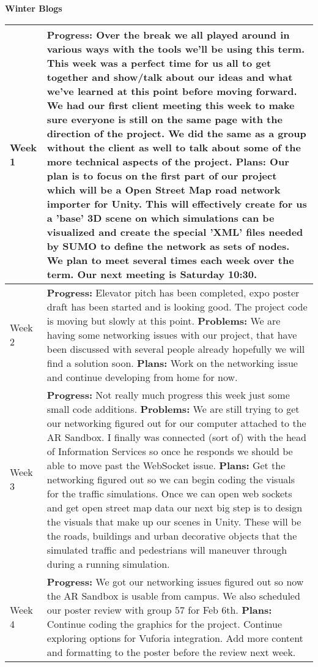 \documentclass[letterpaper, 10pt, onecolumn, draftclsnofoot]{IEEEtran}
\begin{document}
        \begin{center}
        \large{\textbf{Winter Blogs}} \\
        \begin{longtable}{|p{4cm}|p{10cm}|}
            \hline
            Week 1 & \textbf{Progress:} Over the break we all played around in various ways with the tools we'll be using this term. This week was a perfect time for us all to get together and show/talk about our ideas and what we've learned at this point before moving forward. We had our first client meeting this week to make sure everyone is still on the same page with the direction of the project. We did the same as a group without the client as well to talk about some of the more technical aspects of the project. \textbf{Plans:} Our plan is to focus on the first part of our project which will be a Open Street Map road network importer for Unity. This will effectively create for us a 'base' 3D scene on which simulations can be visualized and create the special 'XML' files needed by SUMO to define the network as sets of nodes. We plan to meet several times each week over the term. Our next meeting is Saturday 10:30.\\
            \hline
            Week 2 & \textbf{Progress:} Elevator pitch has been completed, expo poster draft has been started and is looking good. The project code is moving but slowly at this point. \textbf{Problems:} We are having some networking issues with our project, that have been discussed with several people already hopefully we will find a solution soon. \textbf{Plans:} Work on the networking issue and continue developing from home for now. \\
            \hline
            Week 3 & \textbf{Progress:} Not really much progress this week just some small code additions. \textbf{Problems:} We are still trying to get our networking figured out for our computer attached to the AR Sandbox. I finally was connected (sort of) with the head of Information Services so once he responds we should be able to move past the WebSocket issue. \textbf{Plans:} Get the networking figured out so we can begin coding the visuals for the traffic simulations. Once we can open web sockets and get open street map data our next big step is to design the visuals that make up our scenes in Unity. These will be the roads, buildings and urban decorative objects that the simulated traffic and pedestrians will maneuver through during a running simulation. \\
            \hline
            Week 4 & \textbf{Progress:} We got our networking issues figured out so now the AR Sandbox is usable from campus. We also scheduled our poster review with group 57 for Feb 6th. \textbf{Plans:} Continue coding the graphics for the project. Continue exploring options for Vuforia integration. Add more content and formatting to the poster before the review next week. \\

\end{longtable}
\end{center}
\end{document}
